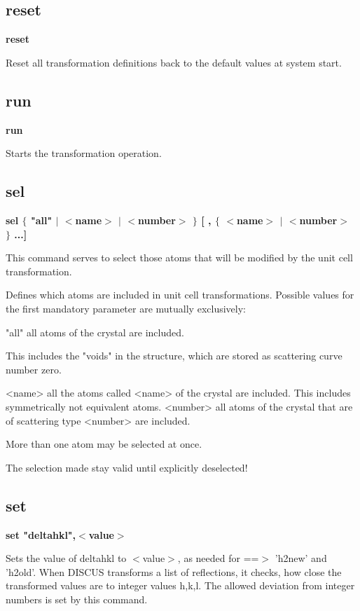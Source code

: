 \subsection*{reset}
{\bf reset \par }
\par
\vspace{3pt}
Reset all transformation definitions back to the default values at 
system start. 
\subsection*{run}
{\bf run \par }
\par
\vspace{3pt}
Starts the transformation operation. 
\subsection*{sel}
{\bf sel $ \{$ "all" $| $ $ <$name$> $ $| $ $ <$number$> $ $\} $ [ , $ \{$ $ <$name$> $ $| $ $ <$number$> $ $\} $ ...] \par }
\par
\vspace{3pt}
This command serves to select 
those atoms that will be modified by the unit cell transformation. 
\par
Defines which atoms are included in unit cell transformations. 
Possible values for the first mandatory parameter are mutually 
exclusively: 
\par
\begin{MacVerbatim}
"all"     all atoms of the crystal are included.
\end{MacVerbatim}
          This includes the "voids" in the structure, which are stored 
          as scattering curve number zero. 
\begin{MacVerbatim}
<name>    all the atoms called <name> of the crystal are included.
          This includes symmetrically not equivalent atoms.
<number>  all atoms of the crystal that are of scattering type <number>
          are included.
\end{MacVerbatim}
More than one atom may be selected at once. 
\par
The selection made stay valid until explicitly deselected! 
\subsection*{set}
{\bf set "deltahkl",$ <$value$> $ \par }
\par
\vspace{3pt}
Sets the value of deltahkl to $ <$value$> $, as needed for ==$> $ 'h2new' and 
'h2old'. When DISCUS transforms a list of reflections, it checks, 
how close the transformed values are to integer values h,k,l. The 
allowed deviation from integer numbers is set by this command. 
